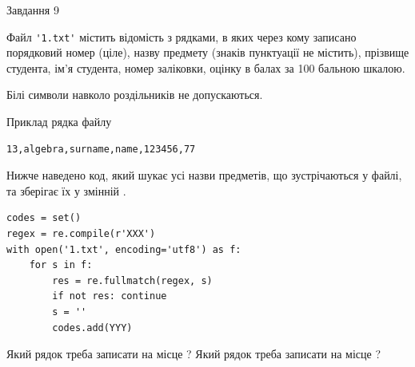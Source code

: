\documentclass[12pt, ukrainian]{article}
\def\code#1{\Verb!#1!}
\begin{document}
{\begin{minipage}[t]{8.0cm}
\end{minipage}

               
{\begin{center}Завдання {9}\end{center}}
\vspace{-4mm}
Файл \code{'1.txt'} містить відомість з рядками, в яких через кому записано поряд\-ковий номер (ціле), назву предмету (знаків пунктуації не містить), прізвище студента, ім'я студента, номер заліковки, оцінку в балах за 100 бальною шкалою.

Білі символи навколо роздільників не допускаються.

Приклад рядка файлу



\begin{verbatim}
13,algebra,surname,name,123456,77
\end{verbatim}


Нижче наведено код, який шукає усі назви предметів, що зустрічаються у файлі, та зберігає їх у змінній .



\begin{verbatim}
codes = set()
regex = re.compile(r'XXX')
with open('1.txt', encoding='utf8') as f:
    for s in f:
        res = re.fullmatch(regex, s)
        if not res: continue
        s = ''
        codes.add(YYY)
\end{verbatim}



Який рядок треба записати на місце  ?
Який рядок треба записати на місце  ?\par

}
\end{document}
